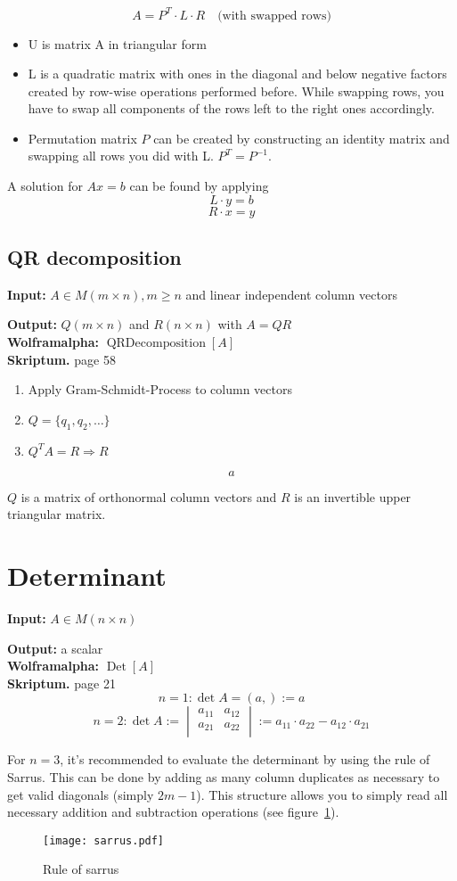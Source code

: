 \documentclass[a4paper,twocolumn]{article}
\newcommand{\io}[2]{{\par\noindent\textbf{Input:} #1 \\}{\textbf{Output:} #2 \\}}
\newcommand{\wa}[1]{\textbf{Wolframalpha:} $#1$ \\}
\newcommand{\scriptref}[1]{\textbf{Skriptum.} page #1 \\}
\begin{document}
\[
    A = P^T \cdot L \cdot R
    \quad\text{(with swapped rows)}
\]
%
\begin{itemize}
  \item U is matrix A in triangular form
  \item L is a quadratic matrix with ones in the diagonal and below
        negative factors created by row-wise operations performed before.
        While swapping rows, you have to swap all components of the rows
        left to the right ones accordingly.
  \item Permutation matrix $P$ can be created by constructing an identity
        matrix and swapping all rows you did with L. $P^T = P^{-1}$.
\end{itemize}

A solution for $Ax = b$ can be found by applying
\[
    L\cdot y = b
\] \[
    R\cdot x = y
\]

\subsection{QR decomposition}

\io{$A \in M(m\times n), m \geq n$ and linear independent column vectors}
    {$Q(m\times n)$ and $R(n\times n)$ with $A = QR$}
\wa{\operatorname{QRDecomposition}[A]}
\scriptref{58}
%
\begin{enumerate}
  \item Apply Gram-Schmidt-Process to column vectors
  \item $Q = \{q_1, q_2, \ldots\}$
  \item $Q^T A = R \Rightarrow R$
\end{enumerate}
\[
    a
\]

$Q$ is a matrix of orthonormal column vectors and $R$ is an invertible upper
triangular matrix.

\section{Determinant}

\io{$A \in M(n\times n)$}{a scalar}
\wa{\operatorname{Det}[A]}
\scriptref{21}
%
\[
    n=1: \det{A} = (a,) := a
\] \[
    n=2: \det{A} := \begin{vmatrix}
        a_{11} & a_{12} \\
        a_{21} & a_{22} \\
    \end{vmatrix} :=
    a_{11}\cdot a_{22} - a_{12}\cdot a_{21}
\]

For $n=3$, it's recommended to evaluate the determinant by using
the rule of Sarrus.
This can be done by adding as many column duplicates as necessary to
get valid diagonals (simply $2m - 1$). This structure allows you to simply
read all necessary addition and subtraction operations
(see figure~\ref{fig:sarrus}).
%
\begin{figure}[h]
  \begin{center}
    \texttt{[image: sarrus.pdf]}
    \caption{Rule of sarrus}
    \label{fig:sarrus}
  \end{center}
\end{figure}
\end{document}
